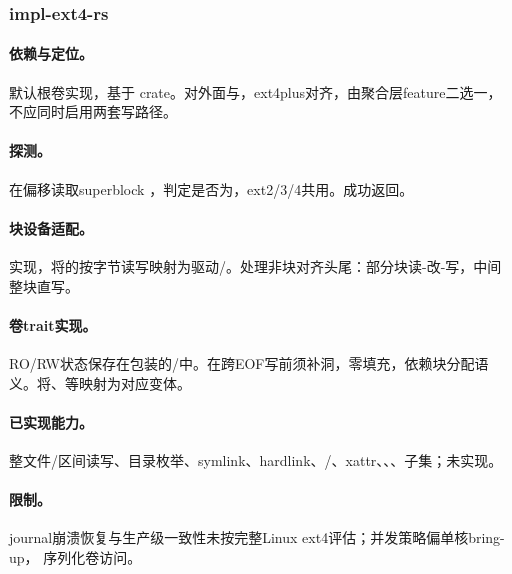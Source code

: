 
\subsubsection{impl-ext4-rs}

\paragraph{依赖与定位。}
默认根卷实现，基于 crate。对外面与，ext4plus对齐，由聚合层feature二选一，不应同时启用两套写路径。

\paragraph{探测。}
在偏移读取superblock ，判定是否为，ext2/3/4共用。成功返回。

\paragraph{块设备适配。}
实现，将的按字节读写映射为驱动/。处理非块对齐头尾：部分块读-改-写，中间整块直写。

\paragraph{卷trait实现。}
RO/RW状态保存在包装的/中。在跨EOF写前须补洞，零填充，依赖块分配语义。将、等映射为对应变体。

\paragraph{已实现能力。}
整文件/区间读写、目录枚举、symlink、hardlink、/、xattr、、、子集；未实现。

\paragraph{限制。}
journal崩溃恢复与生产级一致性未按完整Linux ext4评估；并发策略偏单核bring-up， 序列化卷访问。

